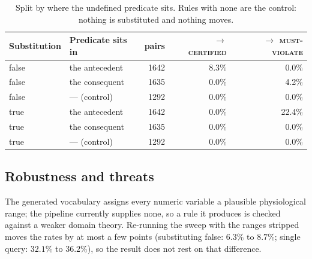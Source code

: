 \begin{table}[t]
  \centering
  \caption{Split by where the undefined predicate sits. Rules with none are the
  control: nothing is substituted and nothing moves.}
  \label{tab:holepos}
  \begin{tabular}{llrrr}
    \toprule
    Substitution & Predicate sits in & pairs & $\rightarrow$ \textsc{certified} & $\rightarrow$ \textsc{must-violate} \\
    \midrule
    \textsf{false} & the antecedent & 1642 & 8.3\% & 0.0\% \\
    \textsf{false} & the consequent & 1635 & 0.0\% & 4.2\% \\
    \textsf{false} & --- (control) & 1292 & 0.0\% & 0.0\% \\
    \addlinespace
    \textsf{true} & the antecedent & 1642 & 0.0\% & 22.4\% \\
    \textsf{true} & the consequent & 1635 & 0.0\% & 0.0\% \\
    \textsf{true} & --- (control) & 1292 & 0.0\% & 0.0\% \\
    \bottomrule
  \end{tabular}
\end{table}

\subsection{Robustness and threats}

The generated vocabulary assigns every numeric variable a plausible
physiological range; the pipeline currently supplies none, so a rule it
produces is checked against a weaker domain theory. Re-running the sweep with
the ranges stripped moves the rates by at most a few points (substituting
\textsf{false}: $6.3\%$ to $8.7\%$; single query: $32.1\%$ to $36.2\%$), so the
result does not rest on that difference.

